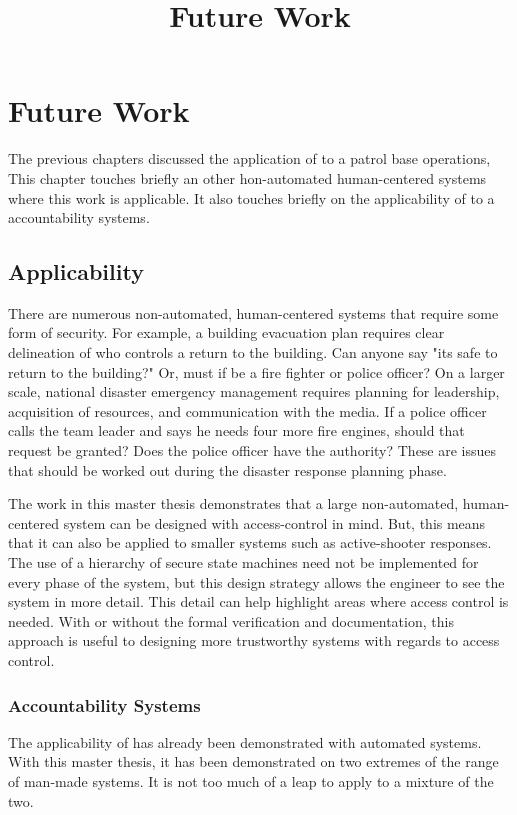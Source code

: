 \documentclass[../../main/main.tex]{subfiles}
\begin{document}
\title{Future Work}
\chapter{Future Work}\label{chp:future}
The previous chapters discussed the application of  to a patrol base operations,  This chapter touches briefly an other hon-automated human-centered systems where this work is applicable. It also touches briefly on the applicability of  to a accountability systems.

\section{Applicability}\label{sec:accountability}


There are numerous non-automated, human-centered systems that require some form of security.  For example, a building evacuation plan requires clear delineation of who controls a return to the building.  Can anyone say "its safe to return to the building?"  Or, must if be a fire fighter or police officer?  On a larger scale, national disaster emergency management requires planning for leadership, acquisition of resources, and communication with the media.  If a police officer calls the team leader and says he needs four more fire engines, should that request be granted?  Does the police officer have the authority?  These are issues that should be worked out during the disaster response planning phase.  

The work in this master thesis demonstrates that a large non-automated, human-centered system can be designed with access-control in mind.  But, this means that it can also be applied to smaller systems such as active-shooter responses.  The use of a hierarchy of secure state machines need not be implemented for every phase of the system, but this design strategy allows the engineer to see the system in more detail.  This detail can help highlight areas where access control is needed.  With or without the formal verification and documentation, this approach is useful to designing more trustworthy systems with regards to access control.


      
\subsection{Accountability Systems}\label{sec:accountability}
The applicability of  has already been demonstrated with automated systems.  With this master thesis, it has been demonstrated on two extremes of the range of man-made systems.  It is not too much of a leap to apply  to a mixture of the two.  
\end{document}
